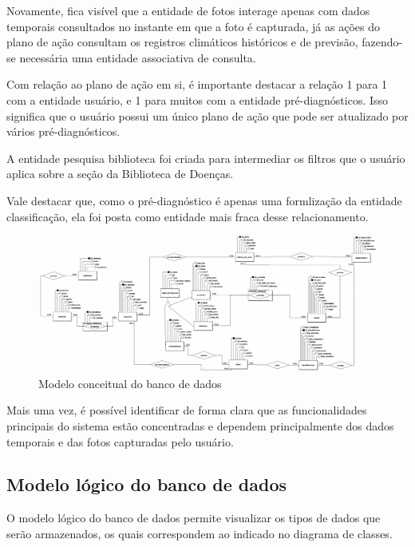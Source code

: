 \documentclass[
  a4paper,%
  12pt,%
  english,%
  brazilian,%
]{article}
\begin{document}
    Novamente, fica visível que a entidade de fotos interage apenas com dados temporais consultados no instante em que a foto é capturada, já as ações do plano de ação consultam os registros climáticos históricos e de previsão, fazendo-se necessária uma entidade associativa de consulta.
    
    Com relação ao plano de ação em si, é importante destacar a relação 1 para 1 com a entidade usuário, e 1 para muitos com a entidade pré-diagnósticos. Isso significa que o usuário possui um único plano de ação  que pode ser atualizado por vários pré-diagnósticos.
    
    A entidade pesquisa biblioteca foi criada para intermediar os filtros que o usuário aplica sobre a seção da Biblioteca de Doenças. 

    Vale destacar que, como o pré-diagnóstico é apenas uma formlização da entidade classificação, ela foi posta como entidade mais fraca desse relacionamento.

        \begin{figure}[h]
\centering
\caption{Modelo conceitual do banco de dados}%
\label{fig:diagrama-objetos}
 \includegraphics[width=1.1\textwidth]{Logos/conceitual.png}
\end{figure}


Mais uma vez, é possível identificar de forma clara que as funcionalidades principais do sistema estão concentradas e dependem principalmente dos dados temporais e das fotos capturadas pelo usuário.

\subsection*{Modelo lógico do banco de dados}

    O modelo lógico do banco de dados permite visualizar os tipos de dados que serão armazenados, os quais correspondem ao indicado no diagrama de classes.
\end{document}

